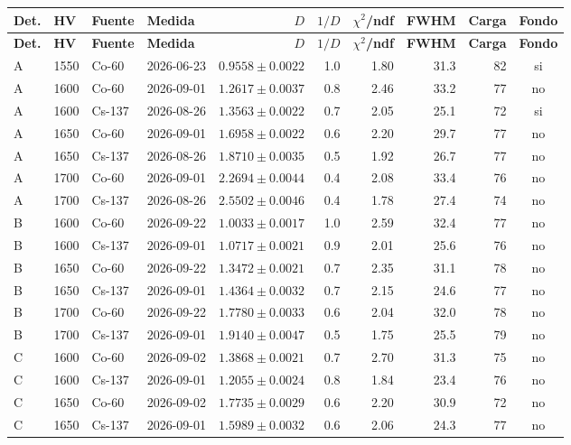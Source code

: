 \begin{longtable}{llllrrrrrc}
\toprule
\textbf{Det.} & \textbf{HV} & \textbf{Fuente} & \textbf{Medida} & \textbf{$D$} & \textbf{$1/D$} & \textbf{$\chi^2$/ndf} & \textbf{FWHM} & \textbf{Carga} & \textbf{Fondo} \\
\midrule
\endfirsthead
\toprule
\textbf{Det.} & \textbf{HV} & \textbf{Fuente} & \textbf{Medida} & \textbf{$D$} & \textbf{$1/D$} & \textbf{$\chi^2$/ndf} & \textbf{FWHM} & \textbf{Carga} & \textbf{Fondo} \\
\midrule
\endhead
A & 1550 & Co-60 & 2026-06-23 & $0.9558 \pm 0.0022$ & 1.0 & 1.80 & 31.3 & 82 & si \\
A & 1600 & Co-60 & 2026-09-01 & $1.2617 \pm 0.0037$ & 0.8 & 2.46 & 33.2 & 77 & no \\
A & 1600 & Cs-137 & 2026-08-26 & $1.3563 \pm 0.0022$ & 0.7 & 2.05 & 25.1 & 72 & si \\
A & 1650 & Co-60 & 2026-09-01 & $1.6958 \pm 0.0022$ & 0.6 & 2.20 & 29.7 & 77 & no \\
A & 1650 & Cs-137 & 2026-08-26 & $1.8710 \pm 0.0035$ & 0.5 & 1.92 & 26.7 & 77 & no \\
A & 1700 & Co-60 & 2026-09-01 & $2.2694 \pm 0.0044$ & 0.4 & 2.08 & 33.4 & 76 & no \\
A & 1700 & Cs-137 & 2026-08-26 & $2.5502 \pm 0.0046$ & 0.4 & 1.78 & 27.4 & 74 & no \\
\midrule
B & 1600 & Co-60 & 2026-09-22 & $1.0033 \pm 0.0017$ & 1.0 & 2.59 & 32.4 & 77 & no \\
B & 1600 & Cs-137 & 2026-09-01 & $1.0717 \pm 0.0021$ & 0.9 & 2.01 & 25.6 & 76 & no \\
B & 1650 & Co-60 & 2026-09-22 & $1.3472 \pm 0.0021$ & 0.7 & 2.35 & 31.1 & 78 & no \\
B & 1650 & Cs-137 & 2026-09-01 & $1.4364 \pm 0.0032$ & 0.7 & 2.15 & 24.6 & 77 & no \\
B & 1700 & Co-60 & 2026-09-22 & $1.7780 \pm 0.0033$ & 0.6 & 2.04 & 32.0 & 78 & no \\
B & 1700 & Cs-137 & 2026-09-01 & $1.9140 \pm 0.0047$ & 0.5 & 1.75 & 25.5 & 79 & no \\
\midrule
C & 1600 & Co-60 & 2026-09-02 & $1.3868 \pm 0.0021$ & 0.7 & 2.70 & 31.3 & 75 & no \\
C & 1600 & Cs-137 & 2026-09-01 & $1.2055 \pm 0.0024$ & 0.8 & 1.84 & 23.4 & 76 & no \\
C & 1650 & Co-60 & 2026-09-02 & $1.7735 \pm 0.0029$ & 0.6 & 2.20 & 30.9 & 72 & no \\
C & 1650 & Cs-137 & 2026-09-01 & $1.5989 \pm 0.0032$ & 0.6 & 2.06 & 24.3 & 77 & no \\

\end{longtable}

